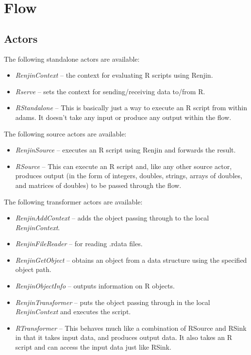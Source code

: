 \documentclass[a4paper]{book}
\begin{document}
\chapter{Flow}
\section{Actors}
The following standalone actors are available:
\begin{itemize}
	\item \textit{RenjinContext} -- the context for evaluating R scripts using Renjin.
	\item \textit{Rserve} -- sets the context for sending/receiving data to/from R.
	\item \textit{RStandalone} -- This is basically just a way to execute an R
	script from within adams. It doesn't take any input or produce any output
	within the flow.
\end{itemize}

\noindent The following source actors are available:
\begin{itemize}
	\item \textit{RenjinSource} -- executes an R script using Renjin and
	forwards the result.
	\item \textit{RSource} -- This can execute an R script and, like any other
	source actor, produces output (in the form of integers, doubles, strings,
	arrays of doubles, and matrices of doubles) to be passed through the flow.
\end{itemize}

\noindent The following transformer actors are available:
\begin{itemize}
	\item \textit{RenjinAddContext} -- adds the object passing through to the
	local \textit{RenjinContext}.
	\item \textit{RenjinFileReader} -- for reading .rdata files.
	\item \textit{RenjinGetObject} -- obtains an object from a data structure using
	the specified object path.
	\item \textit{RenjinObjectInfo} -- outputs information on R objects.
	\item \textit{RenjinTransformer} -- puts the object passing through in the local
	\textit{RenjinContext} and executes the script.
	\item \textit{RTransformer} -- This behaves much like a combination of RSource
	and RSink in that it takes input data, and produces output data. It also takes
	an R script and can access the input data just like RSink.
\end{itemize}
\end{document}
